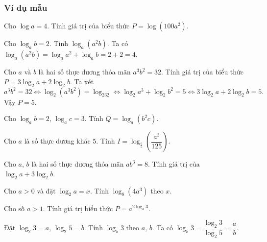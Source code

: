 \subsubsection{Ví dụ mẫu}
\begin{vd}
	Cho $\log a=4$. Tính giá trị của biểu thức $P=\log (100a^2)$.
\end{vd}
\begin{vd}
	Cho $\log_ab=2$. Tính $\log_a(a^2b)$.
	\loigiai
	{
		Ta có $\log_a(a^2b)=\log_aa^2+\log_ab=2+2=4$.
	}
\end{vd}
\begin{vd}
	Cho $a$ và $b$ là hai số thực dương thỏa mãn $a^3 b^2=32$. Tính giá trị của biểu thức $P=3\log _{2} a+2 \log _{2} b$.
	\loigiai
	{
		Ta xét
		$$a^3b^2=32\Leftrightarrow \log_2(a^3b^2)=\log_232\Leftrightarrow\log_2a^3+\log_2b^2=5\Leftrightarrow 3\log_2a+2\log_2b=5.$$
		Vậy $P=5$.
	}
\end{vd}
\begin{vd}
	Cho $\log_ab=2$, $\log_ac=3$. Tính $Q=\log_a\left(b^2c\right)$.
\end{vd}
\begin{vd}
	Cho $a$ là số thực dương khác $5.$ Tính $I=\log_{\tfrac{a}{5}}\left(\dfrac{a^{3}}{125}\right)$.
\end{vd}
\begin{vd}
	Cho $a$, $b$ là hai số thực dương thỏa mãn $a b^{3}=8$. Tính giá trị của $\log _2 a+3 \log _2 b$.
\end{vd}
\begin{vd}
	Cho $a>0$ và đặt $\log_2 a=x$. Tính $\log_8 (4a^3)$ theo $x$.
\end{vd}
\begin{vd}
	Cho số $a>1$. Tính giá trị biểu thức $P=a^{2\log_a3}$. 	
\end{vd}
\begin{vd}
	Đặt $\log_2 3=a$, $\log_2 5=b$. Tính $\log_5 3$ theo $a$, $b$.
	\loigiai
	{Ta có $\log_5 3=\dfrac{\log_2 3}{\log_2 5}=\dfrac{a}{b}$.
	}
\end{vd}
